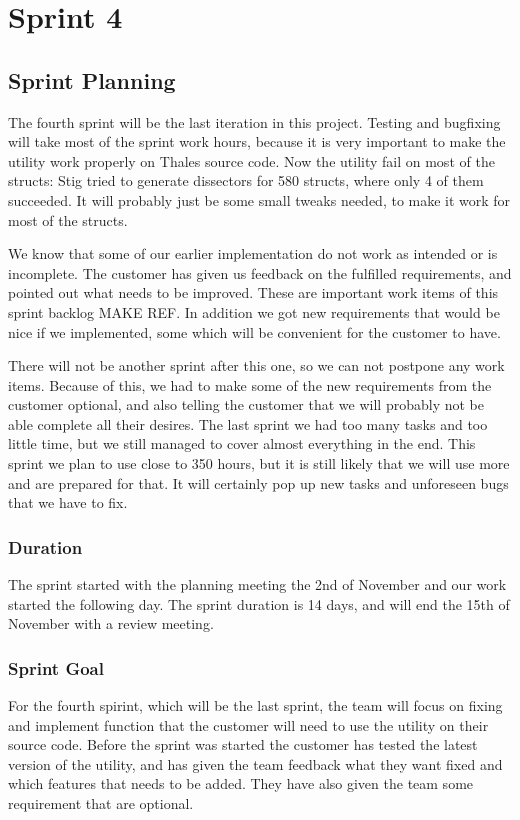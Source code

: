 \chapter{Sprint 4}


\section{Sprint Planning}
The fourth sprint will be the last iteration in this project. Testing and bugfixing will take most of the sprint work hours, because it is very important to make the utility work properly on Thales source code. Now the utility fail on most of the structs: Stig tried to generate dissectors for 580 structs, where only 4 of them succeeded. It will probably just be some small tweaks needed, to make it work for most of the structs.

We know that some of our earlier implementation do not work as intended or is incomplete. The customer has given us feedback on the fulfilled requirements, and pointed out what needs to be improved. These are important work items of this sprint backlog MAKE REF. In addition we got new requirements that would be nice if we implemented, some which will be convenient for the customer to have. 

There will not be another sprint after this one, so we can not postpone any work items. Because of this, we had to make some of the new requirements from the customer optional, and also telling the customer that we will probably not be able complete all their desires. The last sprint we had too many tasks and too little time, but we still managed to cover almost everything in the end. This sprint we plan to use close to 350 hours, but it is still likely that we will use more and are prepared for that. It will certainly pop up new tasks and unforeseen bugs that we have to fix.

\subsection{Duration}
The sprint started with the planning meeting the 2nd of November and our work started the following day. The sprint duration is 14 days, and will end the 15th of November with a review meeting. 

\subsection{Sprint Goal}
For the fourth spirint, which will be the last sprint, the team will focus on fixing and implement function that the customer will need to use the utility on their source code. Before the sprint was started the customer has tested the latest version of the utility, and has given the team feedback what they want fixed and which features that needs to be added. They have also given the team some requirement that are optional. 

